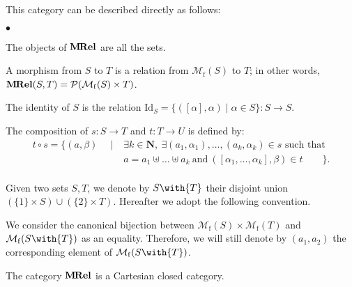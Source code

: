 \documentclass{LMCS}
\newcommand{\nat}{\mathbf{N}}
\newcommand{\st}{ \mid }
\newcommand{\MRel}{\bold{M\hspace{-1pt}Rel}}
\newcommand{\Pow}[1]{\cP(#1)}
\newcommand{\Id}[1]{\mathrm{Id}_{#1}}
\newcommand{\comp}{\circ}
\newcommand{\With}[2]{{#1}\with{#2}}
\newcommand{\Mfin}[1]{\mathcal{M}_{\mathrm{f}}(#1)}
\newcommand{\mcup}{\uplus}
\newcommand{\cP}{\mathcal{P}}
\begin{document}
This category can be described directly as follows:
\begin{iteMize}{$\bullet$}
\item 
    The objects of $\MRel$ are all the sets.
\item 
    A  morphism from $S$ to $T$ is a relation from $\Mfin S$ to $T$; in other words, $\MRel(S,T)=\Pow{\Mfin S\times T}$.
\item 
    The identity of $S$ is the relation $\Id{S}=\{([\alpha],\alpha)\st \alpha\in S\} : S\to S$.
\item 
    The composition of $s : S\to T$ and $t : T\to U$ is defined by:
    $$
    \begin{array}{ll}
    t\comp s=\{(a,\beta)\quad \st&\exists k\in\nat,\ \exists (a_1,\alpha_1),\dots,(a_k,\alpha_k)\in s\textrm{ such that } \\
					       &a = a_1\mcup\dots\mcup a_k\ \text{and}\ ([\alpha_1,\dots,\alpha_k],\beta)\in t\qquad \}.\\
    \end{array}
    $$
\end{iteMize}

\noindent Given two sets $S,T$, we denote by $\With{S}{T}$ their disjoint union $(\{1\}\times S) \cup (\{2\}\times T)$. 
Hereafter we adopt the following convention.

\begin{conv} 
We consider the canonical bijection between $\Mfin{S}\times\Mfin{T}$ and $\Mfin{\With{S}{T}}$ 
as an equality.
Therefore, we will still denote by $(a_1,a_2)$ the corresponding element of $\Mfin{\With{S}{T}}$.
\end{conv}

\begin{thm}\label{thm:MRel-ccc} The category $\MRel$ is a Cartesian closed category.
\end{thm}
\end{document}

